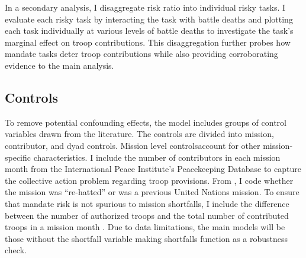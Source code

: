 \documentclass[12pt]{article}
\begin{document}


In a secondary analysis, I disaggregate risk ratio into individual risky tasks. I evaluate each risky task by interacting the task with battle deaths and plotting each task individually at various levels of battle deaths to investigate the task's marginal effect on troop contributions. This disaggregation further probes how mandate tasks deter troop contributions while also providing corroborating evidence to the main analysis. 

\subsection*{Controls}

To remove potential confounding effects, the model includes groups of control variables drawn from the literature. The controls are divided into mission, contributor, and dyad controls. Mission level controls\footnotemark[13] account for other mission-specific characteristics. I include the number of contributors in each mission month from the International Peace Institute's Peacekeeping Database \cite{perry2013} to capture the collective action problem regarding troop provisions. From \cite{koops2015oxford}, I code whether the mission was ``re-hatted'' or was a previous United Nations mission. To ensure that mandate risk is not spurious to mission shortfalls, I include the difference between the number of authorized troops and the total number of contributed troops in a mission month \citep{passmore2018}. Due to data limitations, the main models will be those without the shortfall variable making shortfalls function as a robustness check. 
\end{document}
